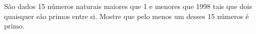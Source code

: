 São dados 15 números naturais maiores que 1 e menores que 1998 tais que dois quaisquer são primos entre si.
Mostre que pelo menos um desses 15 números é primo.